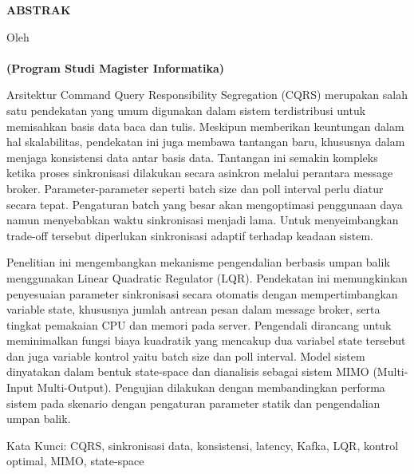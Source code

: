 \clearpage
\pagestyle{empty}


\begin{center}
    \fontsize{14}{17}\selectfont \bfseries \MakeUppercase{ABSTRAK}
    \singlespacing
    \fontsize{14}{17}\selectfont \bfseries \MakeUppercase{\thetitle}
    
    \vspace{\baselineskip}

   \normalsize \normalfont
    Oleh\\
    \textbf{\fontsize{14pt}{17pt}\selectfont \theauthor \\[0.5ex]
    (Program Studi Magister Informatika)}
    
    \vspace{3\baselineskip}
\end{center}

\begin{singlespace}

Arsitektur Command Query Responsibility Segregation (CQRS) merupakan salah satu pendekatan yang umum digunakan dalam sistem terdistribusi untuk memisahkan basis data baca dan tulis. Meskipun memberikan keuntungan dalam hal skalabilitas, pendekatan ini juga membawa tantangan baru, khususnya dalam menjaga konsistensi data antar basis data. Tantangan ini semakin kompleks ketika proses sinkronisasi dilakukan secara asinkron melalui perantara message broker. Parameter-parameter seperti batch size dan poll interval perlu diatur secara tepat. Pengaturan batch yang besar akan mengoptimasi penggunaan daya namun menyebabkan waktu sinkronisasi menjadi lama. Untuk menyeimbangkan trade-off tersebut diperlukan sinkronisasi adaptif terhadap keadaan sistem.

Penelitian ini mengembangkan mekanisme pengendalian berbasis umpan balik menggunakan Linear Quadratic Regulator (LQR). Pendekatan ini memungkinkan penyesuaian parameter sinkronisasi secara otomatis dengan mempertimbangkan variable state, khususnya jumlah antrean pesan dalam message broker, serta tingkat pemakaian CPU dan memori pada server. Pengendali dirancang untuk meminimalkan fungsi biaya kuadratik yang mencakup dua variabel state tersebut dan juga variable kontrol yaitu batch size dan poll interval. Model sistem dinyatakan dalam bentuk state-space dan dianalisis sebagai sistem MIMO (Multi-Input Multi-Output). Pengujian dilakukan dengan membandingkan performa sistem pada skenario dengan pengaturan parameter statik dan pengendalian umpan balik.

Kata Kunci: CQRS, sinkronisasi data, konsistensi, latency, Kafka, LQR, kontrol optimal, MIMO, state-space

\end{singlespace}

\clearpage